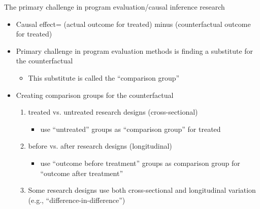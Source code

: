 \begin{frame}{The primary challenge in program evaluation/causal inference research}
	\begin{itemize}
	\item Causal effect= (actual outcome for treated) minus (counterfactual outcome for treated)
	\vspace{2mm}	
	\item Primary challenge in program evaluation methods is finding a substitute for the counterfactual
		\begin{itemize}
		\item This substitute is called the ``comparison group''
		\end{itemize}
	\vspace{2mm}			
	\item Creating comparison groups for the counterfactual
		\begin{enumerate}
		\item treated vs. untreated research designs (cross-sectional)
			\begin{itemize}
			\item use ``untreated'' groups as ``comparison group'' for treated
			\end{itemize}
		\item before vs. after research designs (longitudinal)
			\begin{itemize}
			\item use ``outcome before treatment'' groups as comparison group for ``outcome after treatment''
			\end{itemize}		
		\item Some research designs use both cross-sectional and longitudinal variation (e.g., ``difference-in-difference'')
		\end{enumerate}
	\end{itemize}
\end{frame}


